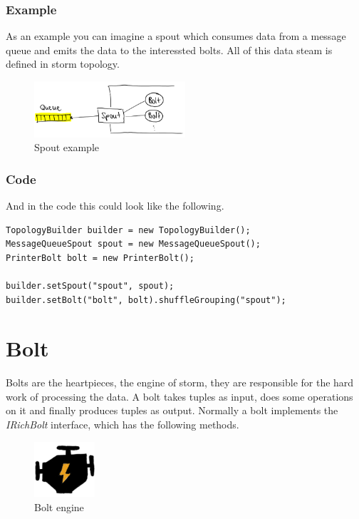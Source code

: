 \subsubsection{Example}
As an example you can imagine a spout which consumes data from a message queue and emits the data
to the interessted bolts. All of this data steam is defined in storm topology.

\begin{figure}[H]
\centering
\captionsetup{justification=centering}
\includegraphics[width=0.5\textwidth]{images/spout_example.png}
\caption[Spout example]{Spout example}
\end{figure}

\subsubsection{Code}
And in the code this could look like the following.
\begin{lstlisting}
TopologyBuilder builder = new TopologyBuilder();
MessageQueueSpout spout = new MessageQueueSpout();
PrinterBolt bolt = new PrinterBolt();

builder.setSpout("spout", spout);
builder.setBolt("bolt", bolt).shuffleGrouping("spout");
\end{lstlisting}


\newpage

\section{Bolt}
Bolts are the heartpieces, the engine of storm, they are responsible for the hard work of processing the data.
A bolt takes tuples as input, does some operations on it and finally produces tuples as output.
Normally a bolt implements the \textit{IRichBolt} interface, which has the following methods.

\begin{figure}[H]
\centering
\captionsetup{justification=centering}
\includegraphics[width=0.2\textwidth]{images/engine.png}
\caption[Bolt engine]{Bolt engine}
\end{figure}


